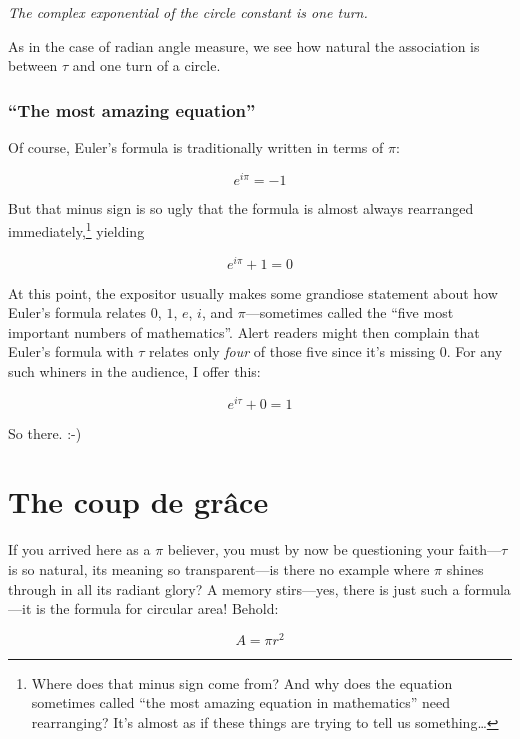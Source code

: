 \documentclass{article}
\begin{document}
\begin{center}
\emph{The complex exponential of the circle constant is one turn.}
\end{center}

\noindent As in the case of radian angle measure, we see how natural the association is between $\tau$ and one turn of a circle.

    \subsubsection{``The most amazing equation''} %
    \label{sec:_the_most_amazing_equation_}
    

Of course, Euler's formula is traditionally written in terms of $\pi$:


\[ e^{i\pi} = -1 \]

\noindent But that minus sign is so ugly that the formula is almost always rearranged immediately,\footnote{Where does that minus sign come from? And why does the equation sometimes called ``the most amazing equation in mathematics'' need rearranging? It's almost as if these things are trying to tell us something\ldots} yielding

\[ e^{i\pi} + 1 = 0 \]

\noindent At this point, the expositor usually makes some grandiose statement about how Euler's formula relates $0$, $1$, $e$, $i$, and $\pi$---sometimes called the ``five most important numbers of mathematics''. Alert readers might then complain that Euler's formula with $\tau$ relates only \emph{four} of those five since it's missing $0$. For any such whiners in the audience, I offer this:

\[ e^{i\tau} + 0 = 1 \]

\noindent So there. :-)

\section{The coup de gr\^{a}ce} %
\label{sec:circular_area}

If you arrived here as a $\pi$ believer, you must by now be questioning your faith---$\tau$ is so natural, its meaning so transparent---is there no example where $\pi$ shines through in all its radiant glory? A memory stirs---yes, there is just such a formula---it is the formula for circular area! Behold:

\[ A = \pi r^2 \]
\end{document}
